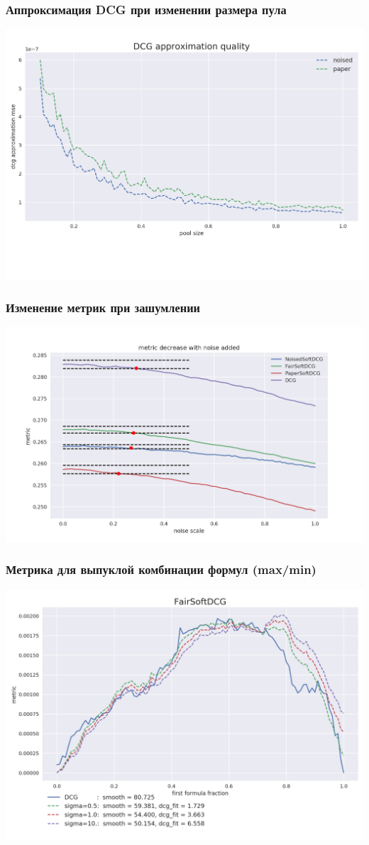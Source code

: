\documentclass[10pt]{beamer}
\begin{document}
\begin{frame}
\frametitle{Аппроксимация DCG при изменении размера пула}
\includegraphics[width=\textwidth]{dcg_approximation}
\end{frame}


\begin{frame}
\frametitle{Изменение метрик при зашумлении}
\includegraphics[width=\textwidth]{noised_metrics}
\end{frame}


\begin{frame}
\frametitle{Метрика для выпуклой комбинации формул (max/min)}
\includegraphics[width=\textwidth]{fair_formula_mix}
\end{frame}
\end{document}
